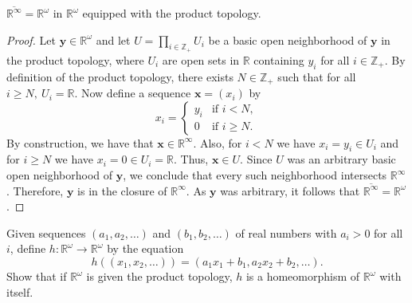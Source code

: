 \documentclass[a4paper,10pt]{article}
\newcommand{\bx}{\mathbf{x}}
\newcommand{\by}{\mathbf{y}}
\newcommand{\RR}{\mathbb{R}}
\begin{document}
\begin{solution}
      $\overline{\mathbb{R}^\infty} = \mathbb{R}^\omega$ in $\mathbb{R}^\omega$ equipped with the product topology.
    \begin{proof}
        Let $\mathbf{y} \in \mathbb{R}^\omega$ and let $U = \prod_{i\in\mathbb{Z}_+} U_i$ be a basic open neighborhood of $\mathbf{y}$ in the product topology, where $U_i$ are open sets in $\mathbb{R}$ containing $y_i$ for all $i \in \mathbb{Z}_+$.
        By definition of the product topology, there exists $N \in \mathbb{Z}_+$ such that for all $i \geq N,~ U_i = \mathbb{R}$.
        Now define a sequence $\mathbf{x} = (x_i)$ by
        \begin{equation*}
            x_i = \begin{cases}
                y_i & \text{if } i < N, \\
                0 & \text{if } i \geq N.
            \end{cases}
        \end{equation*}
        By construction, we have that $\mathbf{x} \in \mathbb{R}^\infty$.
        Also, for $i < N$ we have $x_i = y_i \in U_i$ and for $i \geq N$ we have $x_i = 0 \in U_i = \RR$.
        Thus, $\bx \in U$.
        Since $U$ was an arbitrary basic open neighborhood of $\by$, we conclude that every such neighborhood intersects $\RR^\infty$.
        Therefore, $\by$ is in the closure of $\RR^\infty$.
        As $\by$ was arbitrary, it follows that $\overline{\RR^\infty} = \RR^\omega$.
    \end{proof}
\end{solution}
\newpage

\begin{exercise}[ID=2.19.8]
    Given sequences $(a_1, a_2, \ldots)$ and $(b_1, b_2, \ldots)$ of real numbers with $a_i > 0$ for all $i$, define $h: \RR^\omega \rightarrow \RR^\omega$ by the equation
    \begin{equation*}
        h((x_1, x_2, \ldots)) = (a_1 x_1 + b_1, a_2 x_2 + b_2, \ldots).
    \end{equation*}
    Show that if $\RR^\omega$ is given the product topology, $h$ is a homeomorphism of $\RR^\omega$ with itself.
\end{exercise}
\end{document}
